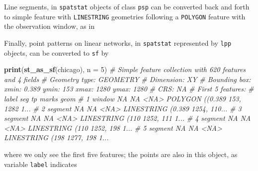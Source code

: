 \documentclass[]{book}
\newenvironment{Shaded}{\begin{snugshade}}{\end{snugshade}}
\newcommand{\CommentTok}[1]{\textcolor[rgb]{0.56,0.35,0.01}{\textit{#1}}}
\newcommand{\DataTypeTok}[1]{\textcolor[rgb]{0.13,0.29,0.53}{#1}}
\newcommand{\DecValTok}[1]{\textcolor[rgb]{0.00,0.00,0.81}{#1}}
\newcommand{\KeywordTok}[1]{\textcolor[rgb]{0.13,0.29,0.53}{\textbf{#1}}}
\newcommand{\NormalTok}[1]{#1}
\newcommand{\OperatorTok}[1]{\textcolor[rgb]{0.81,0.36,0.00}{\textbf{#1}}}
\begin{document}
Line segments, in \texttt{spatstat} objects of class \texttt{psp} can be converted
back and forth to simple feature with \texttt{LINESTRING} geometries
following a \texttt{POLYGON} feature with the observation window, as in

\begin{Shaded}
\end{Shaded}

Finally, point patterns on linear networks, in \texttt{spatstat}
represented by \texttt{lpp} objects, can be converted to \texttt{sf} by

\begin{Shaded}
\begin{Highlighting}[]
\KeywordTok{print}\NormalTok{(}\KeywordTok{st_as_sf}\NormalTok{(chicago), }\DataTypeTok{n =} \DecValTok{5}\NormalTok{)}
\CommentTok{# Simple feature collection with 620 features and 4 fields}
\CommentTok{# Geometry type: GEOMETRY}
\CommentTok{# Dimension:     XY}
\CommentTok{# Bounding box:  xmin: 0.389 ymin: 153 xmax: 1280 ymax: 1280}
\CommentTok{# CRS:           NA}
\CommentTok{# First 5 features:}
\CommentTok{#     label seg tp marks                           geom}
\CommentTok{# 1  window  NA NA  <NA> POLYGON ((0.389 153, 1282 1...}
\CommentTok{# 2 segment  NA NA  <NA> LINESTRING (0.389 1254, 110...}
\CommentTok{# 3 segment  NA NA  <NA> LINESTRING (110 1252, 111 1...}
\CommentTok{# 4 segment  NA NA  <NA> LINESTRING (110 1252, 198 1...}
\CommentTok{# 5 segment  NA NA  <NA> LINESTRING (198 1277, 198 1...}
\end{Highlighting}
\end{Shaded}

where we only see the first five features; the points are also
in this object, as variable \texttt{label} indicates
\end{document}
